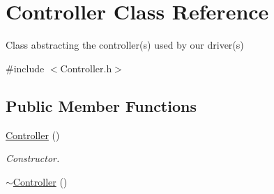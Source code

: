 \hypertarget{class_r_j_f_r_c2011_1_1_controller}{
\section{Controller Class Reference}
\label{class_r_j_f_r_c2011_1_1_controller}
}


Class abstracting the controller(s) used by our driver(s)  




{\ttfamily \#include $<$Controller.h$>$}

\subsection*{Public Member Functions}
\begin{DoxyCompactItemize}
\item 
\hyperlink{class_r_j_f_r_c2011_1_1_controller_aeee02f1e6f84f42452208c1bf0bb62cf}{Controller} ()
\begin{DoxyCompactList}\small\item\em Constructor. \item\end{DoxyCompactList}\item 
\hypertarget{class_r_j_f_r_c2011_1_1_controller_a7c5e0bfebaa8d00a48ef8ce35aeadf56}{
\hyperlink{class_r_j_f_r_c2011_1_1_controller_a7c5e0bfebaa8d00a48ef8ce35aeadf56}{$\sim$Controller} ()}
\label{class_r_j_f_r_c2011_1_1_controller_a7c5e0bfebaa8d00a48ef8ce35aeadf56}


\end{DoxyCompactItemize}
